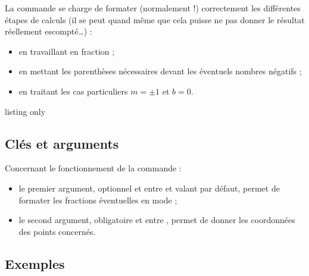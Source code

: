 \begin{warningblock}
La commande se charge de formater (normalement !) correctement les différentes étapes de calculs (il se peut quand même que cela puisse ne pas donner le résultat réellement escompté\ldots) :

\begin{itemize}
	\item en travaillant en fraction ;
	\item en mettant les parenthèses nécessaires devant les éventuels nombres négatifs ;
	\item en traitant les cas particuliers $m=\pm1$ et $b=0$.
\end{itemize}
\vspace*{-\baselineskip}\leavevmode
\end{warningblock}

\begin{PresCodeTexPL}{listing only}
\end{PresCodeTexPL}

\subsection{Clés et arguments}

\begin{cautionblock}
Concernant le fonctionnement de la commande :

\begin{itemize}
	\item le premier argument, optionnel et entre \ctex{[...]} et valant \Cle{[d]} par défaut, permet de formater les fractions éventuelles en mode  ;
	\item le second argument, obligatoire et entre , permet de donner les coordonnées des points concernés.
\end{itemize}
\vspace*{-\baselineskip}\leavevmode
\end{cautionblock}

\begin{PresCodePL}{}
\end{PresCodePL}

\subsection{Exemples}

\begin{PresCodePL}{}
\end{PresCodePL}

